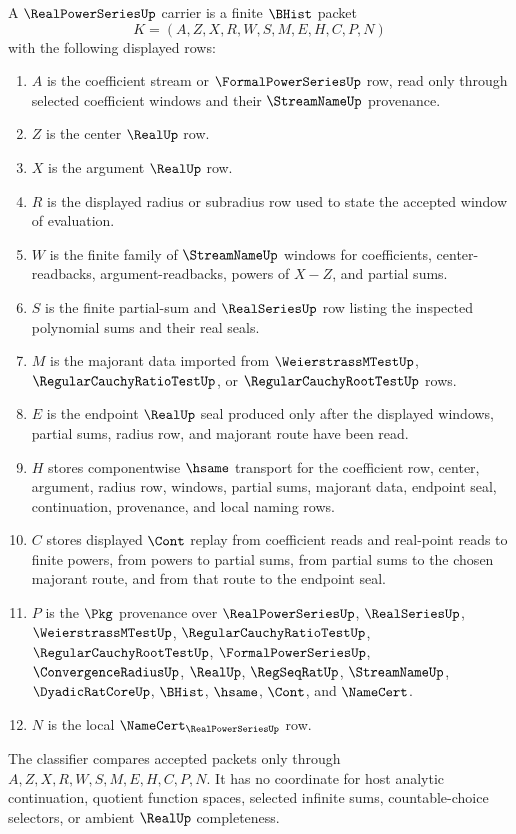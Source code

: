 \begin{definition}\label{def:real-power-series-carrier}
A $\RealPowerSeriesUp$ carrier is a finite $\BHist$ packet
$$
K=(A,Z,X,R,W,S,M,E,H,C,P,N)
$$
with the following displayed rows:
\begin{enumerate}
\item $A$ is the coefficient stream or $\FormalPowerSeriesUp$ row, read only through selected coefficient windows and their $\StreamNameUp$ provenance.
\item $Z$ is the center $\RealUp$ row.
\item $X$ is the argument $\RealUp$ row.
\item $R$ is the displayed radius or subradius row used to state the accepted window of evaluation.
\item $W$ is the finite family of $\StreamNameUp$ windows for coefficients, center-readbacks, argument-readbacks, powers of $X-Z$, and partial sums.
\item $S$ is the finite partial-sum and $\RealSeriesUp$ row listing the inspected polynomial sums and their real seals.
\item $M$ is the majorant data imported from $\WeierstrassMTestUp$, $\RegularCauchyRatioTestUp$, or $\RegularCauchyRootTestUp$ rows.
\item $E$ is the endpoint $\RealUp$ seal produced only after the displayed windows, partial sums, radius row, and majorant route have been read.
\item $H$ stores componentwise $\hsame$ transport for the coefficient row, center, argument, radius row, windows, partial sums, majorant data, endpoint seal, continuation, provenance, and local naming rows.
\item $C$ stores displayed $\Cont$ replay from coefficient reads and real-point reads to finite powers, from powers to partial sums, from partial sums to the chosen majorant route, and from that route to the endpoint seal.
\item $P$ is the $\Pkg$ provenance over $\RealPowerSeriesUp$, $\RealSeriesUp$, $\WeierstrassMTestUp$, $\RegularCauchyRatioTestUp$, $\RegularCauchyRootTestUp$, $\FormalPowerSeriesUp$, $\ConvergenceRadiusUp$, $\RealUp$, $\RegSeqRatUp$, $\StreamNameUp$, $\DyadicRatCoreUp$, $\BHist$, $\hsame$, $\Cont$, and $\NameCert$.
\item $N$ is the local $\NameCert_{\RealPowerSeriesUp}$ row.
\end{enumerate}
The classifier compares accepted packets only through $A,Z,X,R,W,S,M,E,H,C,P,N$. It has no coordinate for host analytic continuation, quotient function spaces, selected infinite sums, countable-choice selectors, or ambient $\RealUp$ completeness.
\end{definition}

